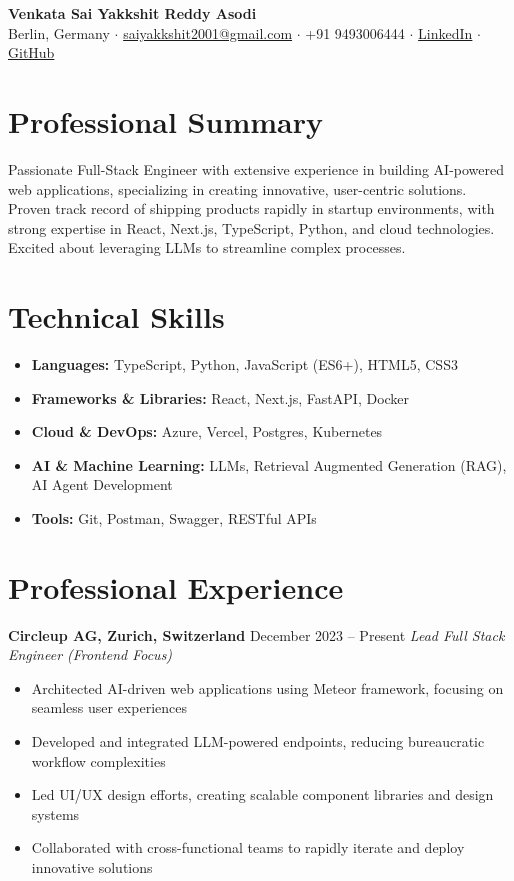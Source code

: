 \documentclass[letterpaper,11pt]{article}
\begin{document}
\begin{center}
{\huge \textbf{Venkata Sai Yakkshit Reddy Asodi}}\\
\vspace{0.2cm}
Berlin, Germany $\cdot$ 
\href{mailto:saiyakkshit2001@gmail.com}{saiyakkshit2001@gmail.com} $\cdot$ 
+91 9493006444 $\cdot$ 
\href{https://linkedin.com/in/yakkshit}{LinkedIn} $\cdot$ 
\href{https://github.com/yakkshit}{GitHub}
\end{center}
\vspace{-5pt}
\section*{Professional Summary}
Passionate Full-Stack Engineer with extensive experience in building AI-powered web applications, specializing in creating innovative, user-centric solutions. Proven track record of shipping products rapidly in startup environments, with strong expertise in React, Next.js, TypeScript, Python, and cloud technologies. Excited about leveraging LLMs to streamline complex processes.
\vspace{-10pt}
\section*{Technical Skills}
\begin{itemize}
\item \textbf{Languages:} TypeScript, Python, JavaScript (ES6+), HTML5, CSS3
\item \textbf{Frameworks \& Libraries:} React, Next.js, FastAPI, Docker
\item \textbf{Cloud \& DevOps:} Azure, Vercel, Postgres, Kubernetes
\item \textbf{AI \& Machine Learning:} LLMs, Retrieval Augmented Generation (RAG), AI Agent Development
\item \textbf{Tools:} Git, Postman, Swagger, RESTful APIs
\end{itemize}

\section*{Professional Experience}

\textbf{Circleup AG, Zurich, Switzerland} \hfill December 2023 -- Present
\textit{Lead Full Stack Engineer (Frontend Focus)}
\begin{itemize}
\item Architected AI-driven web applications using Meteor framework, focusing on seamless user experiences
\item Developed and integrated LLM-powered endpoints, reducing bureaucratic workflow complexities
\item Led UI/UX design efforts, creating scalable component libraries and design systems
\item Collaborated with cross-functional teams to rapidly iterate and deploy innovative solutions
\end{itemize}
\end{document}
